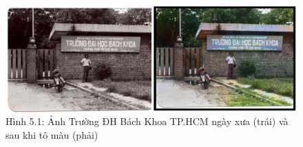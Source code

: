 \documentclass[a4paper]{article}
\begin{document}
\begin{figure}[h!]
\centering
\includegraphics[width=17cm]{images/5_1.PNG}
\caption*{Hình 5.1: Ảnh Trường ĐH Bách Khoa TP.HCM ngày xưa (trái) và sau khi tô màu (phải)}
\end{figure}

\clearpage

\renewcommand{\refname}{Tài liệu tham khảo}
\end{document}
